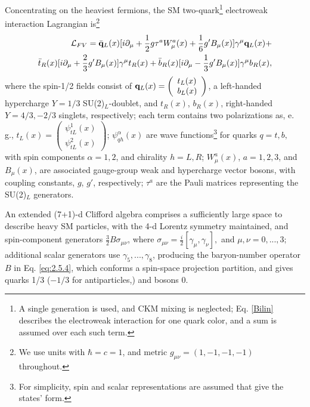 \documentclass[12pt]{article}
\renewcommand\[{\begin{dmath}}
\renewcommand\]{\end{dmath}}
\begin{document}
Concentrating on the heaviest fermions, the SM two-quark\footnote{A single generation is used, and CKM mixing is neglected; Eq. \ref{Bilin} describes the electroweak interaction for   one quark color, and a sum is assumed over each  such term. }  electroweak  interaction  Lagrangian\cite{Glashow} is\footnote{We use units with $\hbar=c=1$, and metric $g_{\mu\nu}=(1,-1,-1,-1) $ throughout.}
\begin{eqnarray}
\label {Bilin}
  {\cal L}_{FV}=  {\bar {  \bf q }_L}(x) [ i\partial_\mu + \frac{1}{2}g\tau^a  W_\mu^a(x)  +\frac{1}{6}g'  B_\mu (x) ] \gamma^\mu  { \bf q}_L (x)     + \nonumber\\{ \bar   t_R      }(x)      [ i\partial_\mu   +\frac{2}{3}g'  B_\mu (x) ]    \gamma^\mu    t_{R}(x)
 +{ \bar   b_R  (x)    }      [ i\partial_\mu    -\frac{1}{3}g'  B_\mu (x) ]    \gamma^\mu    b_{R}(x),
\end{eqnarray}
where   the   spin-1/2  fields  consist of $  {\bf q}_{L}(x)=\left(\begin{array}{lcr}
   t_{L}(x)  \\
  b_{L}(x)
 \end{array}\right)$, a  left-handed        hypercharge $Y =1/3$  SU(2)$_L$-doublet,  and  $t_{R }(x)$, $b_{R }(x)$,  right-handed  $Y  = 4/3, -2/3$ singlets, respectively; each  term contains two  polarizations   as,  e. g., $     t_{L}(x)=\left(\begin{array}{lcr}
     \psi_{tL}^1(x) \\
  \psi_{tL}^2(x)
 \end{array}\right)$;    $\psi_{qh}^\alpha(x)$ are wave functions\footnote{For simplicity, spin and scalar representations are assumed that give the states' form.}  for quarks $q=t,b,$ with spin components $\alpha=1,2$, and chirality  $h=L,R$;   $W_\mu^a(x)$, $a=1,2,3$, and  $B_\mu (x)$,  are    associated gauge-group weak and hypercharge vector bosons, with  coupling constants,  $g$, $g'$,
 respectively;  $\tau^a  $  are the Pauli matrices representing the  SU(2)$_L$  generators.

 An extended (7+1)-d   Clifford algebra comprises a sufficiently large space to describe heavy SM particles\cite{BesproRicardo,Romero}, with the 4-d Lorentz symmetry maintained, and  spin-component   generators     $\frac{3}{2}B\sigma_{\mu\nu}$,  where
$ \label {sigmamunu}
 \sigma_{\mu\nu}=\frac{i}{2}[\gamma_\mu ,\gamma_\nu ],
 $
   and $\mu ,\nu =0,...,3;$ additional scalar generators use $\gamma_{5}, ..., \gamma_{8}$,   producing the
baryon-number   operator $B$ in Eq. \ref{eq:2.5.4},
  which   conforms a  spin-space projection partition,  and   gives quarks
   1/3 ($-1/3$ for  antiparticles,) and  bosons 0.
\end{document}
